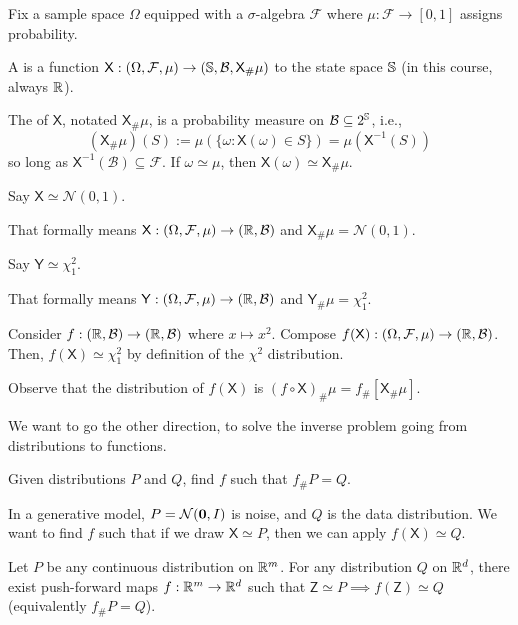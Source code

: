 \documentclass[notes]{agony}
\newcommand{\rv}{\mathsf}
\newcommand{\B}{\mathcal{B}}
\renewcommand{\N}{\mathcal{N}}
\newcommand{\stdspace}{(\Omega, \mathcal{F}, \mu)}
\begin{document}
\begin{defn}
	Fix a sample space $\Omega$ equipped with a $\sigma$-algebra $\mathcal{F}$
	where $\mu : \mathcal{F} \to [0,1]$ assigns probability.

	A  is a function $\rv X : \stdspace \to (\bb S, \B, \rv X_\#\mu)$
	to the state space $\mathbb S$ (in this course, always $\mathbb{R}$).

	The  of $\rv X$, notated $\rv X_\#\mu$,
	is a probability measure on $\B \subseteq 2^{\bb S}$, i.e.,
	\[ (\rv X_\#\mu)(S) := \mu(\{\omega : \rv X(\omega) \in S\}) = \mu(\rv X^{-1}(S)) \]
	so long as $\rv X^{-1}(\mathcal B) \subseteq \mathcal F$.
	If $\omega \simeq \mu$, then $\rv X(\omega) \simeq \rv X_\#\mu$.
\end{defn}
\begin{example}
	Say $\rv X \simeq \N(0,1)$.

	That formally means
	$\rv X : \stdspace \to (\R, \B)$ and $\rv X_\#\mu = \N(0,1)$.
\end{example}
\begin{example}
	Say $\rv Y \simeq \chi^2_1$.

	That formally means
	$\rv Y : \stdspace \to (\R, \B)$ and $\rv Y_\#\mu = \chi^2_1$.
\end{example}

Consider $f : (\R,\B) \to (\R,\B)$ where $x \mapsto x^2$.
Compose $f(\rv X) : \stdspace \to (\R,\B)$.
Then, $f(\rv X) \simeq \chi^2_1$ by definition of the $\chi^2$ distribution.

Observe that the distribution of $f(\rv X)$ is $(f\circ \rv X)_\#\mu = f_\#[\rv X_\# \mu]$.

We want to go the other direction, to solve the inverse problem going from
distributions to functions.

\begin{problem}
	Given distributions $P$ and $Q$, find $f$ such that $f_\#P = Q$.
\end{problem}

In a generative model, $P = \N(\vb 0,I)$ is noise, and $Q$ is the data distribution.
We want to find $f$ such that if we draw $\rv X \simeq P$, then we can apply
$f(\rv X) \simeq Q$.

\begin{theorem}
	Let $P$ be any continuous distribution on $\mathbb{R}^m$.
	For any distribution $Q$ on $\mathbb{R}^d$, there exist push-forward maps
	$f : \mathbb{R}^m \to \mathbb{R}^d$ such that $\rv Z \simeq P \implies f(\rv Z) \simeq Q$
	(equivalently $f_\#P = Q$).
\end{theorem}
\end{document}
